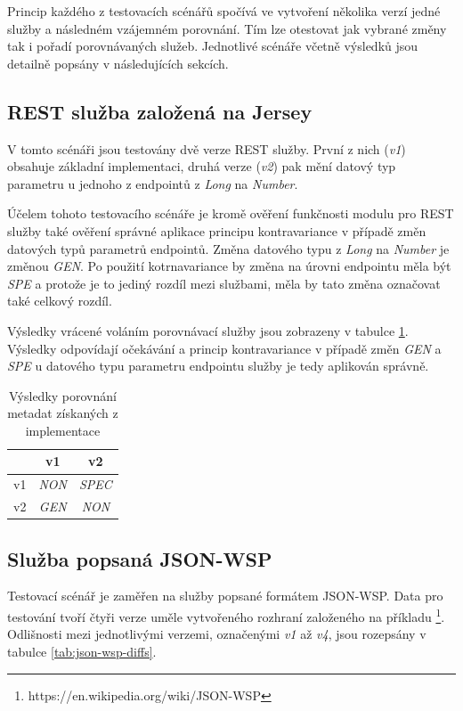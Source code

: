 \documentclass[czech,DP]{thesiskiv}
\begin{document}
Princip každého z testovacích scénářů spočívá ve vytvoření několika verzí jedné služby a následném vzájemném porovnání. Tím lze otestovat jak vybrané změny tak i pořadí porovnávaných služeb. Jednotlivé scénáře včetně výsledků jsou detailně popsány v následujících sekcích.

\subsection{REST služba založená na Jersey}

V tomto scénáři jsou testovány dvě verze REST služby. První z nich (\textit{v1}) obsahuje základní implementaci, druhá verze (\textit{v2}) pak mění datový typ parametru u jednoho z endpointů z \textit{Long} na \textit{Number}.

Účelem tohoto testovacího scénáře je kromě ověření funkčnosti modulu pro REST služby také ověření správné aplikace principu kontravariance v případě změn datových typů parametrů endpointů. Změna datového typu z \textit{Long} na \textit{Number} je změnou \textit{GEN}. Po použití kotrnavariance by změna na úrovni endpointu měla být \textit{SPE} a protože je to jediný rozdíl mezi službami, měla by tato změna označovat také celkový rozdíl.

Výsledky vrácené voláním porovnávací služby jsou zobrazeny v tabulce \ref{tab:jersey-cmp-res}. Výsledky odpovídají očekávání a princip kontravariance v případě změn \textit{GEN} a \textit{SPE} u datového typu parametru endpointu služby je tedy aplikován správně.

\begin{table}[h]
	\centering
	\begin{tabular}{|l||c|c|}
		\hline
		& v1 & v2 \\
		\hline
		\hline
		v1 & \textit{NON} & \textit{SPEC} \\
		\hline
		v2 & \textit{GEN} & \textit{NON} \\
		\hline
	\end{tabular}
	\caption{Výsledky porovnání metadat získaných z implementace}
	\label{tab:jersey-cmp-res}
\end{table}
	
\subsection{Služba popsaná JSON-WSP}

Testovací scénář je zaměřen na služby popsané formátem JSON-WSP. Data pro testování tvoří čtyři verze uměle vytvořeného rozhraní založeného na příkladu \footnote{https://en.wikipedia.org/wiki/JSON-WSP}. Odlišnosti mezi jednotlivými verzemi, označenými \textit{v1} až \textit{v4}, jsou rozepsány v tabulce \ref{tab:json-wsp-diffs}.
\end{document}
